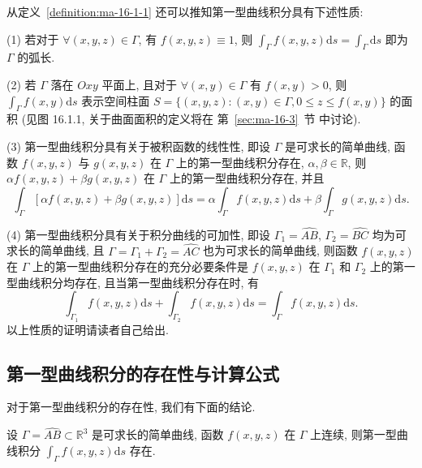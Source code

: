 从定义~\ref{definition:ma-16-1-1} 还可以推知第一型曲线积分具有下述性质:

(1) 若对于 $\forall(x,y,z)\in\Gamma$, 有 $f(x,y,z)\equiv1$, 则 $\int_\Gamma f(x,y,z)\mathrm ds=\int_\Gamma \mathrm ds$ 即为 $\Gamma$ 的弧长.

(2) 若 $\Gamma$ 落在 $Oxy$ 平面上, 且对于 $\forall(x,y)\in\Gamma$ 有 $f(x,y)>0$, 则 $\int_\Gamma f(x,y)\mathrm ds$ 表示空间柱面 $S=\{(x,y,z):(x,y)\in\Gamma,0\leqslant z\leqslant f(x,y)\}$ 的面积 (见图 16.1.1, 关于曲面面积的定义将在 第~\ref{sec:ma-16-3}~节 中讨论).

(3) 第一型曲线积分具有关于被积函数的线性性, 即设 $\Gamma$ 是可求长的简单曲线, 函数 $f(x,y,z)$ 与 $g(x,y,z)$ 在 $\Gamma$ 上的第一型曲线积分存在, $\alpha,\beta\in\mathbb R$, 则 $\alpha f(x,y,z)+\beta g(x,y,z)$ 在 $\Gamma$ 上的第一型曲线积分存在, 并且
\[
  \int_\Gamma [\alpha f(x,y,z)+\beta g(x,y,z)]\mathrm ds
  =\alpha\int_\Gamma f(x,y,z)\mathrm ds
  +\beta\int_\Gamma g(x,y,z)\mathrm ds.
\]

(4) 第一型曲线积分具有关于积分曲线的可加性, 即设 $\Gamma_1=\widehat{AB}$, $\Gamma_2=\widehat{BC}$ 均为可求长的简单曲线, 且 $\Gamma=\Gamma_1+\Gamma_2=\widehat{AC}$ 也为可求长的简单曲线, 则函数 $f(x,y,z)$ 在 $\Gamma$ 上的第一型曲线积分存在的充分必要条件是 $f(x,y,z)$ 在 $\Gamma_1$ 和 $\Gamma_2$ 上的第一型曲线积分均存在, 且当第一型曲线积分存在时, 有
\[
  \int_{\Gamma_1} f(x,y,z)\mathrm ds+\int_{\Gamma_2} f(x,y,z)\mathrm ds
  =\int_\Gamma f(x,y,z)\mathrm ds.
\]
以上性质的证明请读者自己给出.

\subsection{第一型曲线积分的存在性与计算公式}
\label{subsec:ma-16-1-2}

对于第一型曲线积分的存在性, 我们有下面的结论.

\begin{theorem}\label{theorem:ma-16-1-1}
设 $\Gamma=\widehat{AB}\subset\mathbb R^3$ 是可求长的简单曲线, 函数 $f(x,y,z)$ 在 $\Gamma$ 上连续, 则第一型曲线积分 $\int_\Gamma f(x,y,z)\mathrm ds$ 存在.
\end{theorem}


